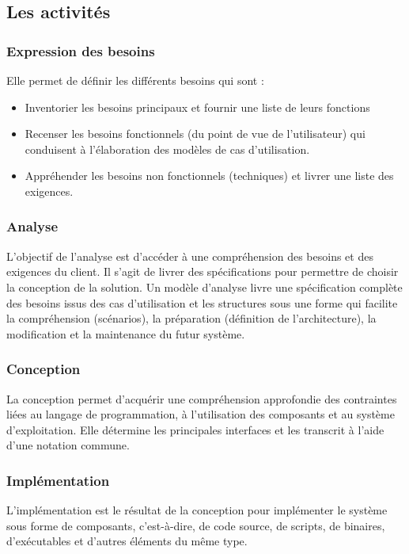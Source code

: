 \documentclass{report}
\begin{document}
\subsection{Les activités}
\subsubsection{Expression des besoins}
Elle permet de définir les différents besoins qui sont :

\begin{itemize}
    \item Inventorier les besoins principaux et fournir une liste de leurs fonctions
    \item Recenser les besoins fonctionnels (du point de vue de l'utilisateur) qui conduisent à l'élaboration des modèles de cas d'utilisation.
    \item Appréhender les besoins non fonctionnels (techniques) et livrer une liste des exigences.
\end{itemize}

\subsubsection{Analyse}
L'objectif de l'analyse est d'accéder à une compréhension des besoins et des exigences du client. Il s'agit de livrer des spécifications pour permettre de choisir la conception de la solution. Un modèle d'analyse livre une spécification complète des besoins issus des cas d'utilisation et les structures sous une forme qui facilite la compréhension (scénarios), la préparation (définition de l'architecture), la modification et la maintenance du futur système.

\subsubsection{Conception}
La conception permet d'acquérir une compréhension approfondie des contraintes liées au langage de programmation, à l'utilisation des composants et au système d'exploitation. Elle détermine les principales interfaces et les transcrit à l'aide d'une notation commune.

\subsubsection{Implémentation}
L'implémentation est le résultat de la conception pour implémenter le système sous forme de composants, c'est-à-dire, de code source, de scripts, de binaires, d'exécutables et d'autres éléments du même type.
\end{document}
